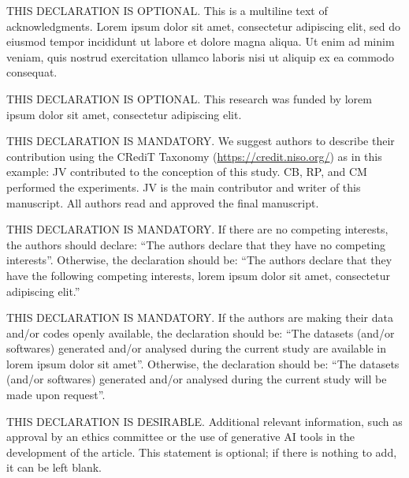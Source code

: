 \documentclass[english]{sbc2025}%
\begin{document}
\begin{declarations}

\begin{acknowledgements}
THIS DECLARATION IS OPTIONAL. This is a multiline text of acknowledgments. Lorem ipsum dolor sit amet, consectetur adipiscing elit, sed do eiusmod tempor incididunt ut labore et dolore magna aliqua. Ut enim ad minim veniam, quis nostrud exercitation ullamco laboris nisi ut aliquip ex ea commodo consequat.
\end{acknowledgements}

\begin{funding}
THIS DECLARATION IS OPTIONAL. This research was funded by lorem ipsum dolor sit amet, consectetur adipiscing elit.
\end{funding}

\begin{contributions}
THIS DECLARATION IS MANDATORY. We suggest authors to describe their contribution using the CRediT Taxonomy (\href{https://credit.niso.org/}{https://credit.niso.org/}) as in this example: JV contributed to the conception of this study. CB, RP, and CM performed the experiments. JV is the main contributor and writer of this manuscript. All authors read and approved the final manuscript. 
\end{contributions}

\begin{interests}
THIS DECLARATION IS MANDATORY. If there are no competing interests, the authors should declare: ``The authors declare that they have no competing interests''. Otherwise, the declaration should be: ``The authors declare that they have the following competing interests, lorem ipsum dolor sit amet, consectetur adipiscing elit.''
\end{interests}

\begin{materials}
THIS DECLARATION IS MANDATORY. If the authors are making their data and/or codes openly available, the declaration should be: ``The datasets (and/or softwares) generated and/or analysed during the current study are available in lorem ipsum dolor sit amet''. Otherwise, the declaration should be: ``The datasets (and/or softwares) generated and/or analysed during the current study will be made upon request''.
\end{materials}

\begin{furtherinformation}
THIS DECLARATION IS DESIRABLE. Additional relevant information, such as approval by an ethics committee or the use of generative AI tools in the development of the article. This statement is optional; if there is nothing to add, it can be left blank.

\end{furtherinformation}

\end{declarations}





\end{document}
